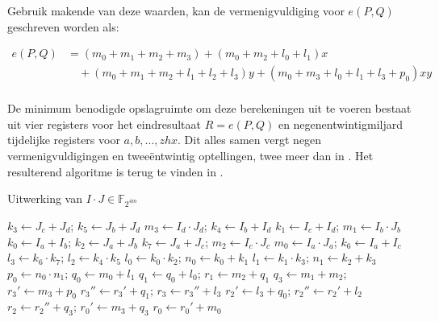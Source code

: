 Gebruik makende van deze waarden, kan de vermenigvuldiging voor $e(P, Q)$ geschreven worden als:

\[\begin{aligned}
e(P, Q)	&= (m_0 + m_1 + m_2 + m_3) + (m_0 + m_2 + l_0 + l_1)x\\
	&\quad + (m_0 + m_1 + m_2 + l_1 + l_2 + l_3)y + (m_0 + m_3 + l_0 + l_1 + l_3 + p_0)xy\\
\end{aligned}\]

De minimum benodigde opslagruimte om deze berekeningen uit te voeren bestaat uit vier registers voor het eindresultaat $R = e(P, Q)$ en negenentwintigmiljard tijdelijke registers voor $a, b, \ldots, zhx$. Dit alles samen vergt negen vermenigvuldigingen en twee\"entwintig optellingen, twee meer dan in \cite{beuchat}. Het resulterend algoritme is terug te vinden in .


\begin{algorithm}
	\caption{Uitwerking van $I \cdot J \in \mathbb{F}_{2^{4m}}$}
	\label{algoritme-implementatie-miller-f4m-mult}
	$k_3 \leftarrow J_c + J_d$; $k_5 \leftarrow J_b + J_d$\;
	$m_3 \leftarrow I_d \cdot J_d$; $k_4 \leftarrow I_b + I_d$\;
	$k_1 \leftarrow I_c + I_d$; $m_1 \leftarrow I_b \cdot J_b$\;
	$k_0 \leftarrow I_a + I_b$; $k_2 \leftarrow J_a + J_b$\;
	$k_7 \leftarrow J_a + J_c$; $m_2 \leftarrow I_c \cdot J_c$\;
	$m_0 \leftarrow I_a \cdot J_a$; $k_6 \leftarrow I_a + I_c$\;
	$l_3 \leftarrow k_6 \cdot k_7$; $l_2 \leftarrow k_4 \cdot k_5$\;
	$l_0 \leftarrow k_0 \cdot k_2$; $n_0 \leftarrow k_0 + k_1$\;
	$l_1 \leftarrow k_1 \cdot k_3$; $n_1 \leftarrow k_2 + k_3$\;
	$p_0 \leftarrow n_0 \cdot n_1$; $q_0 \leftarrow m_0 + l_1$\;
	$q_1 \leftarrow q_0 + l_0$; $r_1 \leftarrow m_2 + q_1$\;
	$q_3 \leftarrow m_1 + m_2$; $r_3' \leftarrow m_3 + p_0$\;
	$r_3'' \leftarrow r_3' + q_1$; $r_3 \leftarrow r_3'' + l_3$\;
	$r_2' \leftarrow l_3 + q_0$; $r_2'' \leftarrow r_2' + l_2$\;
	$r_2 \leftarrow r_2'' + q_3$; $r_0' \leftarrow m_3 + q_3$\;
	$r_0 \leftarrow r_0' + m_0$\;
\end{algorithm}

